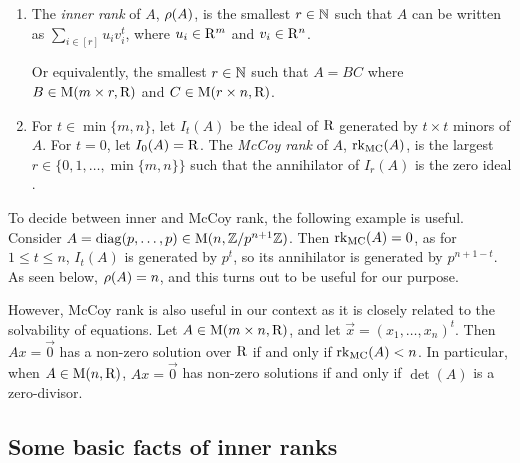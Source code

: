 \begin{enumerate}
	
	
	\item The \emph{inner rank} of $A$, $\rho(A)$, is the smallest $r\in\mathbb{N}$ such that $A$ can be written as $\sum_{i\in[r]}u_iv_i^t$, where $u_i\in \mathrm{R}^m$ and $v_i\in\mathrm{R}^n$. 
	
	Or equivalently, the smallest $r\in \mathbb{N}$ such that $A=BC$ where $B\in\mathrm{M}(m\times r, \mathrm{R})$ and $C\in\mathrm{M}(r\times n, \mathrm{R})$. 
	
\item For $t\in \min\{m, n\}$, let $I_t(A)$ be the ideal of $\mathrm{R}$ 
generated by $t\times t$ minors of $A$. For $t=0$, let $I_0(A)=\mathrm{R}$. The \emph{McCoy rank} of $A$, $\mathrm{rk}_{\textrm{MC}}(A)$, is the largest $r\in \{0, 1, \dots,  \min\{m, n\}\}$ such that the annihilator of $I_r(A)$ is the zero ideal \cite{McCoy-Rank}. 
\end{enumerate}


To decide between inner and McCoy rank, the following example \cite[Section 4.2, Example 3]{inner-rank-comp} is useful. Consider $A=\operatorname{diag}(p, \dots, p)\in \mathrm{M}(n, \mathbb{Z}/p^{n+1}\mathbb{Z})$. Then $\mathrm{rk}_{\textrm{MC}}(A)=0$, as for $1\leq t\leq n$, $I_t(A)$ is generated by $p^t$, so its annihilator is generated by $p^{n+1-t}$. As seen below, $\rho(A)=n$, and this turns out to be useful for our purpose. 

However, McCoy rank is also useful in our context as it is closely related to the solvability of equations. Let $A\in \mathrm{M}(m\times n, \mathrm{R})$, and let $\vec{x}=(x_1, \dots, x_n)^t$. Then $Ax=\vec{0}$ has a non-zero solution over $\mathrm{R}$ if and only if $\mathrm{rk}_{\textrm{MC}}(A)<n$. In particular, when $A\in\mathrm{M}(n, \mathrm{R})$, $Ax=\vec{0}$ has %
non-zero solutions if and only if $\det(A)$ is a zero-divisor.

\subsection{Some basic facts of inner ranks}

